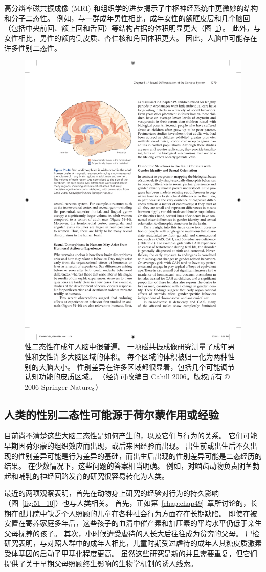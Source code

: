 高分辨率磁共振成像 (MRI) 和组织学的进步揭示了中枢神经系统中更微妙的结构和分子二态性。
例如，与一群成年男性相比，成年女性的额眶皮层和几个脑回（包括中央前回、额上回和舌回）等结构占据的体积明显更大（图~\ref{fig:51_14}）。
此外，与女性相比，男性的额内侧皮质、杏仁核和角回体积更大。
因此，人脑中可能存在许多性别二态性。


\begin{figure}[htbp]
	\centering
	\includegraphics[width=0.5\linewidth]{chap51/fig_51_14}
	\caption{性二态性在成年人脑中很普遍。 一项磁共振成像研究测量了成年男性和女性许多大脑区域的体积。 每个区域的体积被归一化为两种性别的大脑大小。 性别差异在许多区域都很显着，包括几个可能调节认知功能的皮质区域。 （经许可改编自 Cahill 2006。版权所有 © 2006 Springer Nature。）}
	\label{fig:51_14}
\end{figure}



\subsection{人类的性别二态性可能源于荷尔蒙作用或经验}

目前尚不清楚这些大脑二态性是如何产生的，以及它们与行为的关系。
它们可能早期因荷尔蒙的组织效应而出现，或后来因经验而出现。
出生前或出生后不久出现的性别差异可能是行为差异的基础，而出生后出现的性别差异可能是二态经历的结果。
在少数情况下，这些问题的答案相当明确。
例如，对啮齿动物负责阴茎勃起和哺乳的神经回路发育的研究很容易转化为人类。


最近的两项观察表明，首先在动物身上研究的经验对行为的持久影响（图~\ref{fig:51_10}）也与人类相关。
首先，正如第~\ref{chap:chap49}~章所讨论的，长期在孤儿院中缺乏个人照顾的儿童在各种社会行为方面存在长期缺陷。
即使在被安置在寄养家庭多年后，这些孩子的血清中催产素和加压素的平均水平仍低于亲生父母抚养的孩子。
其次，小时候遭受虐待的人长大后往往成为贫穷的父母。 尸检研究表明，与对照人群中的成年人相比，儿童时期受过虐待的成年人其糖皮质激素受体基因的启动子甲基化程度更高。
虽然这些研究是新的并且需要重复，但它们提供了关于早期父母照顾终生影响的生物学机制的诱人线索。



